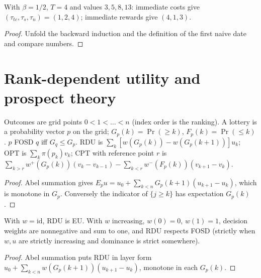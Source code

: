 \begin{theorem}
\label{thm:beh-or-examples}
\leanok
{}
With $\beta=1/2$, $T=4$ and values $3,5,8,13$: immediate costs give $(\tau_{tc},\tau_s,\tau_n)=(1,2,4)$;
immediate rewards give $(4,1,3)$.
\end{theorem}
\begin{proof}
\leanok
Unfold the backward induction and the definition of the first naive date and compare numbers.
\end{proof}

\section{Rank-dependent utility and prospect theory}
\label{sec:beh-rdu}

\begin{definition}
\label{def:beh-lottery}
\leanok
Outcomes are grid points $0<1<\dots<n$ (index order is the ranking). A lottery is a probability vector $p$ on the
grid; $G_p(k)=\Pr(\ge k)$, $F_p(k)=\Pr(\le k)$. $p$ FOSD $q$ iff $G_q\le G_p$. RDU is
$\sum_k[w(G_p(k))-w(G_p(k+1))]u_k$; OPT is $\sum_k\pi(p_k)v_k$; CPT with reference point $r$ is
$\sum_{k>r}w^+(G_p(k))(v_k-v_{k-1})-\sum_{k<r}w^-(F_p(k))(v_{k+1}-v_k)$.
\end{definition}

\begin{theorem}
\label{thm:beh-fosd-eu}
\leanok
{}
\end{theorem}
\begin{proof}
\leanok
Abel summation gives $E_pu=u_0+\sum_{k<n}G_p(k+1)(u_{k+1}-u_k)$, which is monotone in $G_p$. Conversely the
indicator of $\{j\ge k\}$ has expectation $G_p(k)$.
\end{proof}

\begin{theorem}
\label{thm:beh-rdu}
\leanok
{}
With $w=\mathrm{id}$, RDU is EU. With $w$ increasing, $w(0)=0$, $w(1)=1$, decision weights are nonnegative and sum
to one, and RDU respects FOSD (strictly when $w,u$ are strictly increasing and dominance is strict somewhere).
\end{theorem}
\begin{proof}
\leanok
Abel summation puts RDU in layer form $u_0+\sum_{k<n}w(G_p(k+1))(u_{k+1}-u_k)$, monotone in each $G_p(k)$.
\end{proof}

